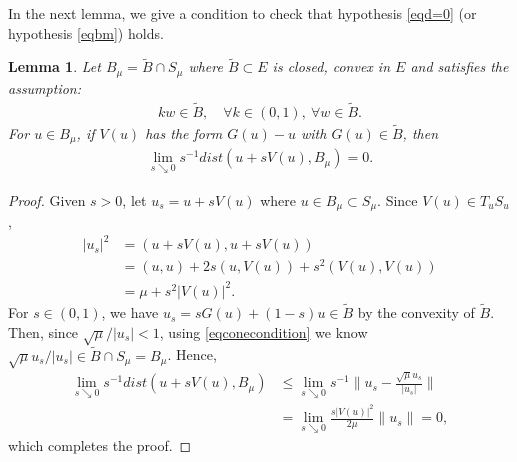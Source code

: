 \documentclass[10pt,a4paper]{article}
\newtheorem{lemma}[theorem]{Lemma}
\theoremstyle{definition} \theoremstyle{remark}
\numberwithin{equation}{section}
\newcommand{\G}{\mathcal{G}}
\newcommand{\B}{\mathcal{B}}
\newcommand{\p}{\mathcal{P}}
\begin{document}
In the next lemma, we give a condition to check that hypothesis \eqref{eqd=0} (or  hypothesis  \eqref{eqbm}) holds.

\begin{lemma} \label{lemconvex}
	Let $B_\mu = \tilde B \cap S_\mu$ where $\tilde B \subset E$ is closed, convex in $E$ and satisfies the assumption:
	\begin{align} \label{eqconecondition}
		kw \in \tilde B, \quad \forall k \in (0,1), \ \forall w \in \tilde B.
	\end{align}
	For $u \in B_\mu$, if $V(u)$ has the form $G(u)-u$ with $G(u) \in \tilde B$, then 
	\begin{align} \label{eqd=0atapoint}
		\lim_{s \searrow 0}s^{-1}dist(u + sV(u),B_\mu) = 0.
	\end{align}
\end{lemma}

\begin{proof}
Given $s>0$, let
	 $u_s = u + sV(u)$ where $u \in B_\mu \subset S_\mu$. Since $V(u) \in T_uS_u$,
	\begin{align*}
		|u_s|^2 & = (u+sV(u),u+sV(u)) \\
		& = (u,u) + 2s(u,V(u)) + s^2(V(u),V(u)) \\
		& = \mu + s^2|V(u)|^2.
	\end{align*}
	For $s \in (0,1)$, we have $u_s = sG(u) + (1-s)u \in \tilde B$ by the convexity of $\tilde B$. Then, since $\sqrt \mu/|u_s| < 1$, using \eqref{eqconecondition} we know $\sqrt \mu u_s/|u_s| \in \tilde B \cap S_\mu = B_\mu$. Hence,
	\begin{align*}
		\lim_{s \searrow 0}s^{-1}dist(u + sV(u),B_\mu) & \leq \lim_{s \searrow 0}s^{-1}\bigl\|u_s -  \frac{\sqrt\mu u_s}{|u_s|}\bigr\| \\
		& = \lim_{s \searrow 0}\frac {s|V(u)|^2}{2\mu}\|u_s\| = 0,
	\end{align*}
	which completes the proof.
\end{proof}

\end{document}
